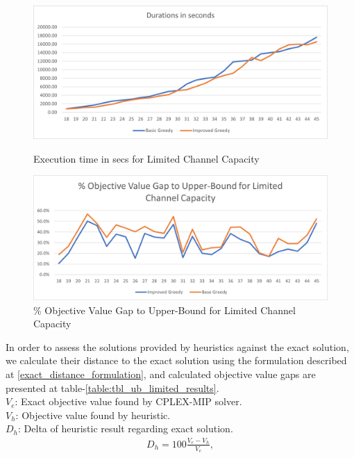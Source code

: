 \documentclass[11pt]{article}
\begin{document}
        \begin{figure}[htb!]
        \centering
        \begin{minipage}{.6\textwidth}
            \centering
            \includegraphics[width=.7\linewidth]{durations_ub_limited_18_45.png}
            \caption{Execution time in secs for Limited Channel Capacity}
            \label{fig:fig_durations_ub_limited_18_45}
        \end{minipage}%
        \begin{minipage}{.6\textwidth}
            \centering
            \includegraphics[width=.7\linewidth]{performance_ub_limited_18_45.png}
            \caption{\% Objective Value Gap to Upper-Bound for Limited Channel Capacity}
            \label{fig:fig_value_gap_ub_limited_18_45}
        \end{minipage}
        \end{figure}

        
\newpage
In order to assess the solutions provided by heuristics against the exact solution, we calculate their distance to the exact solution using the formulation described at \equationautorefname \eqref{exact_distance_formulation}, and calculated objective value gaps are presented at table-\ref{table:tbl_ub_limited_results}.\\

\noindent $V_{e}$: Exact objective value found by CPLEX-MIP solver. \\
\noindent $V_{h}$: Objective value found by heuristic. \\
\noindent $D_{h}$: Delta of heuristic result regarding exact solution. \\
\begin{align}
&D_{h} = 100 \frac{V_{e} - V_{h}}{V_{e}}, \label{exact_distance_formulation}&
\end{align}\\
\end{document}
